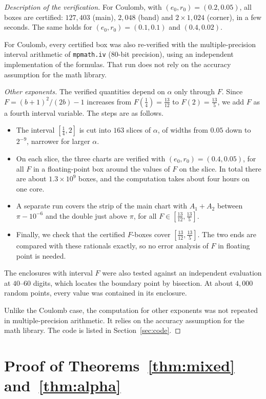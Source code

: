 \documentclass[11pt]{amsart}
\theoremstyle{remark}
\begin{document}
\begin{proof}[Description of the verification]
For Coulomb, with $(e_0,r_0)=(0.2,0.05)$, all boxes are certified: $127{,}403$ (main), $2{,}048$ (band) and
$2\times1{,}024$ (corner), in a few seconds. The same holds for $(e_0,r_0)=(0.1,0.1)$ and $(0.4,0.02)$.

For Coulomb, every certified box was also re-verified with the multiple-precision interval arithmetic of
\texttt{mpmath.iv} (80-bit precision), using an independent implementation of the formulas. That run does not rely on
the accuracy assumption for the math library.

\emph{Other exponents.} The verified quantities depend on $\alpha$ only through $F$. Since
$F=(b+1)^2/(2b)-1$ increases from $F(\tfrac14)=\tfrac{13}{12}$ to $F(2)=\tfrac{13}5$, we add $F$ as a fourth interval
variable. The steps are as follows.
\begin{itemize}
\item The interval $[\tfrac14,2]$ is cut into $163$ slices of $\alpha$, of widths from $0.05$ down to $2^{-9}$, narrower
  for larger $\alpha$.
\item On each slice, the three charts are verified with $(e_0,r_0)=(0.4,0.05)$, for all $F$ in a floating-point box
  around the values of $F$ on the slice. In total there are about $1.3\times10^9$ boxes, and the computation takes
  about four hours on one core.
\item A separate run covers the strip of the main chart with $A_1+A_2$ between $\pi-10^{-6}$ and the double just above
  $\pi$, for all $F\in[\tfrac{13}{12},\tfrac{13}5]$.
\item Finally, we check that the certified $F$-boxes cover $[\tfrac{13}{12},\tfrac{13}5]$. The two ends are compared
  with these rationals exactly, so no error analysis of $F$ in floating point is needed.
\end{itemize}
The enclosures with interval $F$ were also tested against an independent evaluation at $40$--$60$ digits, which locates
the boundary point by bisection. At about $4{,}000$ random points, every value was contained in its enclosure.

Unlike the Coulomb case, the computation for other exponents was not repeated in multiple-precision arithmetic. It
relies on the accuracy assumption for the math library. The code is listed in Section~\ref{sec:code}.
\end{proof}

\section{Proof of Theorems~\ref{thm:mixed} and~\ref{thm:alpha}}\label{sec:proof2}
\end{document}
